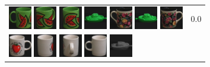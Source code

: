 {\begin{figure}[p]
\begin{tabular}{m{11cm} | m{3cm} |}
\includegraphics[width=1cm]{coil/beeld-31.eps}
\includegraphics[width=1cm]{coil/beeld-33.eps}
\includegraphics[width=1cm]{coil/beeld-32.eps}
\includegraphics[width=1cm]{coil/beeld-55.eps}
\includegraphics[width=1cm]{coil/beeld-61.eps}
\includegraphics[width=1cm]{coil/beeld-54.eps}
\includegraphics[width=1cm]{coil/beeld-60.eps}
& {\scriptsize 0.0}
\\
\includegraphics[width=1cm]{coil/beeld-36.eps}
\includegraphics[width=1cm]{coil/beeld-38.eps}
\includegraphics[width=1cm]{coil/beeld-41.eps}
\includegraphics[width=1cm]{coil/beeld-37.eps}
\includegraphics[width=1cm]{coil/beeld-27.eps}

\end{tabular}
\end{figure}}

